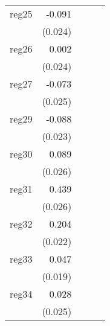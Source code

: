 {\begin{longtable}{l*{4}{D{.}{.}{-1}}}
\addlinespace
reg25       &      -0.091\sym{***}&                     &                     &                     \\
            &     (0.024)         &                     &                     &                     \\
\addlinespace
reg26       &       0.002         &                     &                     &                     \\
            &     (0.024)         &                     &                     &                     \\
\addlinespace
reg27       &      -0.073\sym{**} &                     &                     &                     \\
            &     (0.025)         &                     &                     &                     \\
\addlinespace
reg29       &      -0.088\sym{***}&                     &                     &                     \\
            &     (0.023)         &                     &                     &                     \\
\addlinespace
reg30       &       0.089\sym{***}&                     &                     &                     \\
            &     (0.026)         &                     &                     &                     \\
\addlinespace
reg31       &       0.439\sym{***}&                     &                     &                     \\
            &     (0.026)         &                     &                     &                     \\
\addlinespace
reg32       &       0.204\sym{***}&                     &                     &                     \\
            &     (0.022)         &                     &                     &                     \\
\addlinespace
reg33       &       0.047\sym{*}  &                     &                     &                     \\
            &     (0.019)         &                     &                     &                     \\
\addlinespace
reg34       &       0.028         &                     &                     &                     \\
            &     (0.025)         &                     &                     &                     \\

\end{longtable}}
